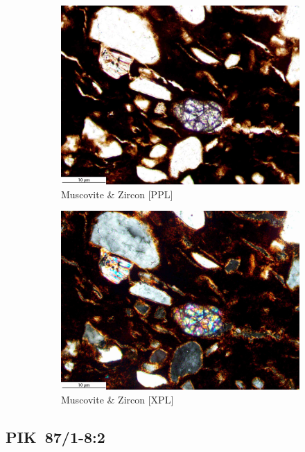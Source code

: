 \documentclass[a4paper]{article}
\begin{document}
\begin{figure}[H]
\begin{subfigure}[t]{.49\textwidth}
		\includegraphics[width=\textwidth]{ThinSections/5-2_20x_PPL.jpg}
		\caption{Muscovite \& Zircon [PPL]}
	\end{subfigure}\hspace{.5em}\hfill
	\begin{subfigure}[t]{.49\textwidth}
		\includegraphics[width=\textwidth]{ThinSections/5-2_20x_XPL.jpg}
		\caption{Muscovite \& Zircon [XPL]}
	\end{subfigure}
	\caption{}
	\label{fig:5_pik}
\end{figure}

\newpage\subsection{PIK~87/1-8:2 \citep[pik\#56; Fig.~\ref{fig:pik.pottery}.7; cf. Ngbanja style;][428 Pl.~47.21]{Seidensticker.2021e}}
\end{document}

